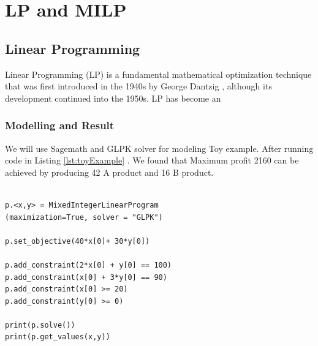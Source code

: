 \section{LP and MILP}

\subsection{Linear Programming}
Linear Programming (LP) is a fundamental mathematical optimization technique that was first introduced in the 1940s by George Dantzig \cite{dantzig2002linear}, although its development continued into the 1950s. LP has become an 
\subsubsection{Modelling and Result}

We will use Sagemath and GLPK solver for modeling Toy example. After running code in Listing  \ref{lst:toyExample} . We found that Maximum profit 2160 can be achieved by producing  42 A product and 16 B product.
\begin{lstlisting}[caption={Sagemath MILP modelling of toy example }, label={lst:toyExample}]

p.<x,y> = MixedIntegerLinearProgram 
(maximization=True, solver = "GLPK")

p.set_objective(40*x[0]+ 30*y[0])

p.add_constraint(2*x[0] + y[0] == 100)
p.add_constraint(x[0] + 3*y[0] == 90)
p.add_constraint(x[0] >= 20)
p.add_constraint(y[0] >= 0)

print(p.solve())
print(p.get_values(x,y))

\end{lstlisting}